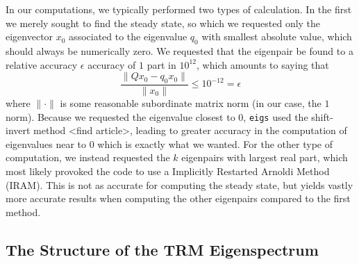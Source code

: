 In our computations, we typically performed two types of calculation. In the first we merely sought to
find the steady state, so which we requested only the eigenvector $x_0$
associated to the
eigenvalue $q_0$ with smallest absolute value, which should always be numerically zero.
We requested that the eigenpair be found to a relative accuracy $\epsilon$ accuracy of $1$ part in $10^{12}$,
which amounts to saying that
\begin{equation} \label{eq:linAlgRelAcc}
 \frac{\| Q x_0 - q_0 x_0 \|}{\| x_0 \|} \le 10^{-12} = \epsilon
\end{equation}
where $\| \cdot \|$ is some reasonable subordinate matrix norm (in our case, the $1$ norm). Because we requested the eigenvalue closest to $0$, \texttt{eigs} used the
shift-invert method <find article>, leading to greater accuracy in the computation of
eigenvalues near to $0$ which is exactly what we wanted. For the other type of
computation, we instead requested the $k$ eigenpairs with largest real part, which
most likely provoked the code to use a Implicitly Restarted Arnoldi Method (IRAM).
This is not as accurate for computing the steady state, but yields vastly more accurate
results when computing the other eigenpairs compared to the first method. 

\subsection{The Structure of the TRM Eigenspectrum}

